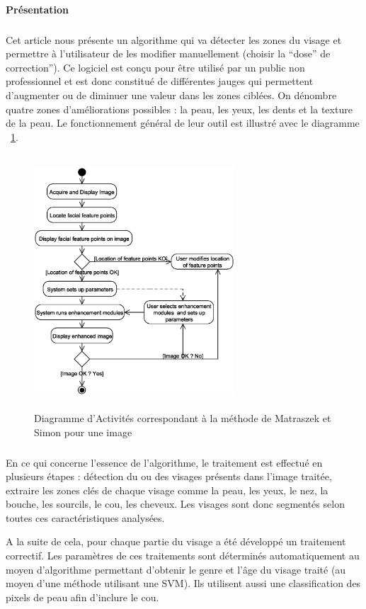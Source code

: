 \documentclass[11pt, french,screen]{report-rd-info}
\begin{document}
\paragraph{Présentation}
\subparagraph{}
Cet article nous présente un algorithme qui va détecter les zones du visage et permettre à l'utilisateur de les modifier manuellement (choisir la “dose” de correction”). Ce logiciel est conçu pour être utilisé par un public non professionnel et est donc constitué de différentes jauges qui permettent d'augmenter ou de diminuer une valeur dans les zones ciblées. On dénombre quatre zones d'améliorations possibles : la peau, les yeux, les dents et la texture de la peau. Le fonctionnement général de leur outil est illustré avec le diagramme ~\ref{diag:diagrammebatch}.
\begin{figure}
\centering
\includegraphics[height=9.5cm,width=7.5cm]{Images/ActivityBatch.eps}
\caption{Diagramme d'Activités correspondant à la méthode de Matraszek et Simon\cite{Matraszek2004} pour une image}
\label{diag:diagrammebatch}
\end{figure}

\subparagraph{}
En ce qui concerne l’essence de l’algorithme, le traitement est effectué en plusieurs étapes : détection du ou des visages présents dans l’image traitée, extraire les zones clés de chaque visage comme la peau, les yeux, le nez, la bouche, les sourcils, le cou, les cheveux. Les visages sont donc segmentés selon toutes ces caractéristiques analysées. 

A la suite de cela, pour chaque partie du visage a été développé un traitement correctif. Les paramètres de ces traitements sont déterminés automatiquement au moyen d’algorithme permettant d’obtenir le genre et l’âge du visage traité (au moyen d’une méthode utilisant une SVM). Ils utilisent aussi une classification des pixels de peau afin d’inclure le cou.
\end{document}
